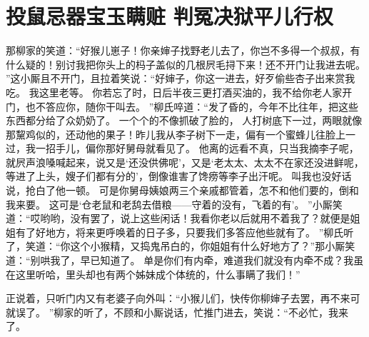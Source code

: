 \chapter{投鼠忌器宝玉瞒赃 \quad 判冤决狱平儿行权}
\par
{}\par
那柳家的笑道：“好猴儿崽子！你亲婶子找野老儿去了，你岂不多得一个叔叔，有什么疑的！别讨我把你头上的杩子盖似的几根屄毛挦下来！还不开门让我进去呢。
”这小厮且不开门，且拉着笑说：“好婶子，你这一进去，好歹偷些杏子出来赏我吃。
我这里老等。
你若忘了时，日后半夜三更打酒买油的，我不给你老人家开门，也不答应你，随你干叫去。
”柳氏啐道：“发了昏的，今年不比往年，把这些东西都分给了众奶奶了。
一个个的不像抓破了脸的，
人打树底下一过，两眼就像那黧鸡似的，还动他的果子！昨儿我从李子树下一走，偏有一个蜜蜂儿往脸上一过，我一招手儿，偏你那好舅母就看见了。
他离的远看不真，只当我摘李子呢，就屄声浪嗓喊起来，说又是‘还没供佛呢’，又是‘老太太、太太不在家还没进鲜呢，等进了上头，嫂子们都有分的’，倒像谁害了馋痨等李子出汗呢。
叫我也没好话说，抢白了他一顿。
可是你舅母姨娘两三个亲戚都管着，怎不和他们要的，倒和我来要。
这可是‘仓老鼠和老鸹去借粮——守着的没有，飞着的有’。
”小厮笑道：“哎哟哟，没有罢了，说上这些闲话！我看你老以后就用不着我了？就便是姐姐有了好地方，将来更呼唤着的日子多，只要我们多答应他些就有了。
”柳氏听了，笑道：“你这个小猴精，又捣鬼吊白的，你姐姐有什么好地方了？”那小厮笑道：“别哄我了，早已知道了。
单是你们有内牵，难道我们就没有内牵不成？我虽在这里听哈，里头却也有两个姊妹成个体统的，什么事瞒了我们！”\par
正说着，只听门内又有老婆子向外叫：“小猴儿们，快传你柳婶子去罢，再不来可就误了。
”柳家的听了，不顾和小厮说话，忙推门进去，笑说：“不必忙，我来了。
